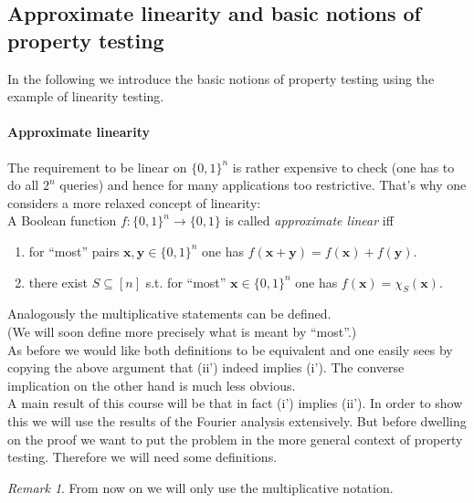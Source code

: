 \documentclass[a4paper]{article}
\newcommand{\nset}{[n]}
\newcommand{\boldx}{\boldsymbol{x}}
\newcommand{\boldy}{\boldsymbol{y}}
\theoremstyle{plain}
\theoremstyle{definition}
\theoremstyle{remark}
\newtheorem*{remark*}{Remark}
\begin{document}
\subsection{Approximate linearity and basic notions of property testing}
\label{sec:appr-line-basic}

In the following we introduce the basic notions of property testing
using the example of linearity testing. 

\paragraph{Approximate linearity}
\label{sec:appr-line}

The requirement to be linear on \(\{0,1\}^n\) is rather expensive to
check (one has to do all \(2^n\) queries) and hence for many
applications too restrictive. That's why one considers a more relaxed
concept of linearity: \\

\noindent A Boolean function \(f:\{0,1\}^n \rightarrow \{0,1\}\) is called
\emph{approximate linear} iff
\begin{enumerate}[label= (\roman*')]
\item for ``most'' pairs \(\boldx,\boldy \in \{0,1\}^n\) one has \(f(\boldx+\boldy) = f(\boldx)
  + f(\boldy)\).
\item there exist \(S \subseteq \nset\) s.t. for ``most'' \(\boldx\in
  \{0,1\}^n\) one has \(f(\boldx) = \chi_S(\boldx)\). 
\end{enumerate}

\noindent Analogously the multiplicative statements can be defined. \\ 

\noindent (We will soon define more precisely what is meant by ``most''.)\\

\noindent As before we would like both definitions to be equivalent
and one easily sees by copying the above argument that (ii') indeed
implies (i'). The converse implication on the other hand is much less
obvious. \\

\noindent A main result of this course will be that in fact (i') implies
(ii'). In order to show this we will use the results of the Fourier
analysis extensively. But before dwelling on the proof we want to put
the problem in the more general context of property testing. Therefore
we will need some definitions. 

\begin{remark*}
  From now on we will only use the multiplicative notation. 
\end{remark*}
\end{document}
